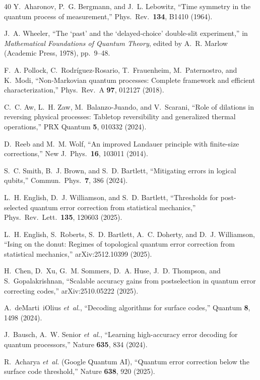 \documentclass[prl,twocolumn,superscriptaddress,longbibliography,floatfix]{revtex4-2}
\begin{document}
\begin{thebibliography}{40}
Y.~Aharonov, P.~G. Bergmann, and J.~L. Lebowitz,
``Time symmetry in the quantum process of measurement,''
Phys.\ Rev.\ \textbf{134}, B1410 (1964).

J.~A. Wheeler,
``The `past' and the `delayed-choice' double-slit experiment,''
in \emph{Mathematical Foundations of Quantum Theory},
edited by A.~R. Marlow (Academic Press, 1978), pp.~9--48.

F.~A. Pollock, C.~Rodr\'iguez-Rosario, T.~Frauenheim,
M.~Paternostro, and K.~Modi,
``Non-Markovian quantum processes: Complete framework and efficient
characterization,''
Phys.\ Rev.\ A \textbf{97}, 012127 (2018).

C.~C. Aw, L.~H. Zaw, M.~Balanzo-Juando, and V.~Scarani,
``Role of dilations in reversing physical processes: Tabletop
reversibility and generalized thermal operations,''
PRX Quantum \textbf{5}, 010332 (2024).

D.~Reeb and M.~M. Wolf,
``An improved Landauer principle with finite-size corrections,''
New J.\ Phys.\ \textbf{16}, 103011 (2014).

S.~C. Smith, B.~J. Brown, and S.~D. Bartlett,
``Mitigating errors in logical qubits,''
Commun.\ Phys.\ \textbf{7}, 386 (2024).

L.~H. English, D.~J. Williamson, and S.~D. Bartlett,
``Thresholds for post-selected quantum error correction from
statistical mechanics,''
Phys.\ Rev.\ Lett.\ \textbf{135}, 120603 (2025).

L.~H. English, S.~Roberts, S.~D. Bartlett, A.~C. Doherty,
and D.~J. Williamson,
``Ising on the donut: Regimes of topological quantum error correction
from statistical mechanics,''
arXiv:2512.10399 (2025).

H.~Chen, D.~Xu, G.~M. Sommers, D.~A. Huse, J.~D. Thompson,
and S.~Gopalakrishnan,
``Scalable accuracy gains from postselection in quantum error
correcting codes,''
arXiv:2510.05222 (2025).

A.~deMarti~iOlius \emph{et~al.},
``Decoding algorithms for surface codes,''
Quantum \textbf{8}, 1498 (2024).

J.~Bausch, A.~W. Senior \emph{et~al.},
``Learning high-accuracy error decoding for quantum processors,''
Nature \textbf{635}, 834 (2024).

R.~Acharya \emph{et~al.} (Google Quantum AI),
``Quantum error correction below the surface code threshold,''
Nature \textbf{638}, 920 (2025).


\end{thebibliography}
\end{document}
